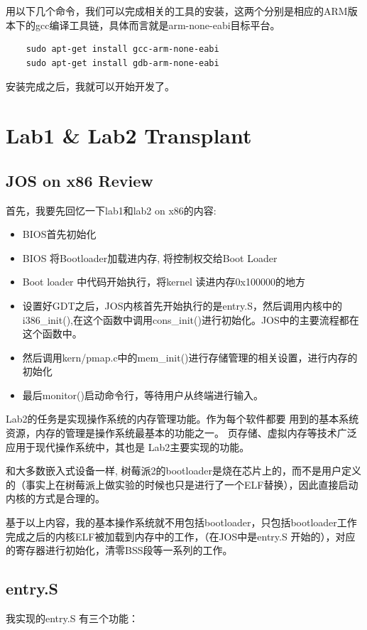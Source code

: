 \documentclass[11pt,a4paper]{article}
\begin{document}
\begin{CJK}{UTF8}{gkai}
	用以下几个命令，我们可以完成相关的工具的安装，这两个分别是相应的ARM版本下的gcc编译工具链，具体而言就是arm-none-eabi目标平台。
	
	\begin{lstlisting}
	sudo apt-get install gcc-arm-none-eabi
	sudo apt-get install gdb-arm-none-eabi
	\end{lstlisting}
	
	安装完成之后，我就可以开始开发了。
	
\section{Lab1 \& Lab2 Transplant}

	\subsection{JOS on x86 Review}
	首先，我要先回忆一下lab1和lab2 on x86的内容:
	
	\begin{itemize}
		\item BIOS首先初始化
		\item BIOS 将Bootloader加载进内存, 将控制权交给Boot Loader
		\item Boot loader 中代码开始执行，将kernel 读进内存0x100000的地方
		\item 设置好GDT之后，JOS内核首先开始执行的是entry.S，然后调用内核中的i386\_init(),在这个函数中调用cons\_init()进行初始化。JOS中的主要流程都在这个函数中。
		\item 然后调用kern/pmap.c中的mem\_init()进行存储管理的相关设置，进行内存的初始化
		\item 最后monitor()启动命令行，等待用户从终端进行输入。		
	\end{itemize}

	Lab2的任务是实现操作系统的内存管理功能。作为每个软件都要 用到的基本系统资源，内存的管理是操作系统最基本的功能之一。 页存储、虚拟内存等技术广泛应用于现代操作系统中，其也是 Lab2主要实现的功能。

	和大多数嵌入式设备一样, 树莓派2的bootloader是烧在芯片上的，而不是用户定义的（事实上在树莓派上做实验的时候也只是进行了一个ELF替换），因此直接启动内核的方式是合理的。
	
	基于以上内容，我的基本操作系统就不用包括bootloader，只包括bootloader工作完成之后的内核ELF被加载到内存中的工作，（在JOS中是entry.S 开始的），对应的寄存器进行初始化，清零BSS段等一系列的工作。
	
	\subsection{entry.S}
		我实现的entry.S 有三个功能：
		

\end{CJK}
\end{document}
